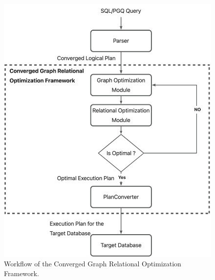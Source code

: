 \begin{figure}
    \centering
    \includegraphics[width=.8\linewidth]{./figures/workflow.png}
    \caption{Workflow of the Converged Graph Relational Optimization Framework.}
    \label{fig:workflow}
\end{figure}


